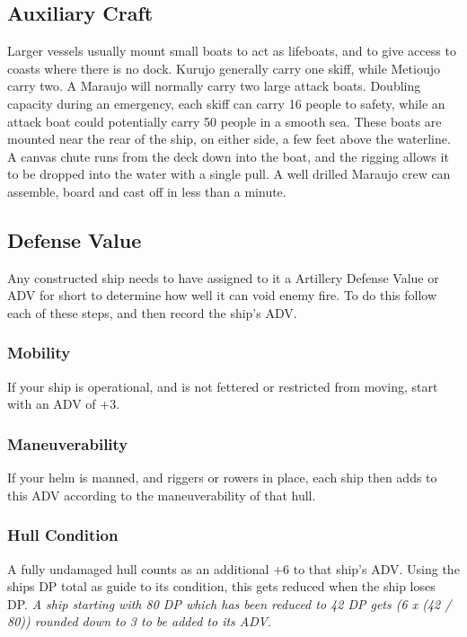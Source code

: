 \subsection{Auxiliary Craft}
Larger vessels usually mount small boats to act as lifeboats, and to give access to coasts where there is no dock. Kurujo generally carry one skiff, while Metioujo carry two. A Maraujo will normally carry two large attack boats. Doubling capacity during an emergency, each skiff can carry 16 people to safety, while an attack boat could potentially carry 50 people in a smooth sea. These boats are mounted near the rear of the ship, on either side, a few feet above the waterline. A canvas chute runs from the deck down into the boat, and the rigging allows it to be dropped into the water with a single pull. A well drilled Maraujo crew can assemble, board and cast off in less than a minute.
\subsection{Defense Value}
Any constructed ship needs to have assigned to it a Artillery Defense Value or ADV for short to determine how well it can void enemy fire. To do this follow each of these steps, and then record the ship's ADV.
\subsubsection{Mobility}

If your ship is operational, and is not fettered or restricted from moving, start with an ADV of +3.
\subsubsection{Maneuverability}

If your helm is manned, and riggers or rowers in place, each ship then adds to this ADV according to the maneuverability of that hull.\\
\begin{normboxc}

\end{normboxc}

\subsubsection{Hull Condition}

A fully undamaged hull counts as an additional +6 to that ship's ADV. Using the ships DP total as guide to its condition, this gets reduced when the ship loses DP. \textit{A ship starting with 80 DP which has been reduced to 42 DP gets (6 x (42 / 80)) rounded down to 3 to be added to its ADV.}
